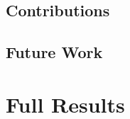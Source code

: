 \documentclass{article}
\begin{document}
\subsection{Contributions}
\subsection{Future Work}

\newpage
\appendix
\section{Full Results}
\label{app:full_res}

\setlength{\tabcolsep}{4pt}
{\tiny
\begin{adjustbox}{angle=90, max width=0.88\textwidth}

\end{adjustbox}
}
\setlength{\tabcolsep}{6pt}

\newpage


\end{document}
